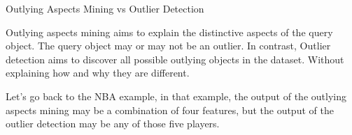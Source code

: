 \documentclass[
size=14pt,
paper=smartboard,  %
mode=present, 		%
display=slides, 	%
style=tuliplab,  	%
pauseslide,
fleqn,leqno]{powerdot}
\begin{document}
\begin{slide}[toc=,bm=]{Outlying Aspects Mining vs Outlier Detection}
\begin{note}
			Outlying aspects mining aims to
			explain the distinctive aspects of the query object.
			The query object may or may not be an outlier.
			In contrast,
			Outlier detection aims to discover all possible
			outlying objects in the dataset.
			Without explaining how and why they are different.
			
			Let's go back to the NBA example,
			in that example,
			the output of the outlying aspects mining may be
			a combination of four features,
			but the output of the outlier detection may be any of those five players.
		\end{note}
		
	\end{slide}
	
\end{document}
